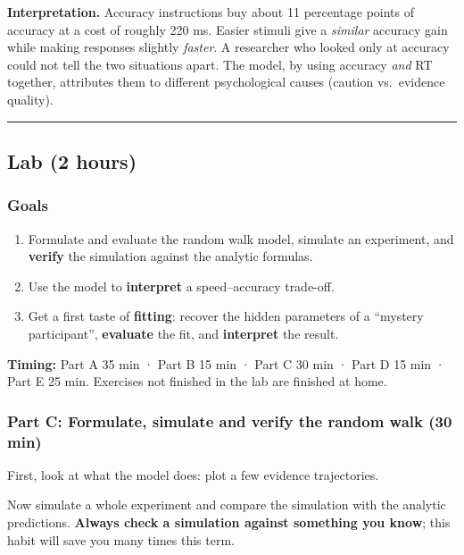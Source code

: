 \textbf{Interpretation.} Accuracy instructions buy about 11 percentage
points of accuracy at a cost of roughly 220 ms. Easier stimuli give a
\emph{similar} accuracy gain while making responses slightly
\emph{faster}. A researcher who looked only at accuracy could not tell
the two situations apart. The model, by using accuracy \emph{and} RT
together, attributes them to different psychological causes (caution
vs.~evidence quality).

\begin{center}\rule{0.5\linewidth}{0.5pt}\end{center}


\subsection{Lab (2 hours)}

\subsubsection{Goals}

\begin{enumerate}
\def\labelenumi{\arabic{enumi}.}
\tightlist
\item
  Formulate and evaluate the random walk model, simulate an experiment, and
  \textbf{verify} the simulation against the analytic formulas.
\item
  Use the model to \textbf{interpret} a speed--accuracy trade-off.
\item
  Get a first taste of \textbf{fitting}: recover the hidden parameters
  of a ``mystery participant'', \textbf{evaluate} the fit, and
  \textbf{interpret} the result.
\end{enumerate}

\textbf{Timing:} Part A 35 min · Part B 15 min · Part C 30 min · Part D
15 min · Part E 25 min. Exercises not finished in the lab are finished
at home.

\subsubsection{Part C: Formulate, simulate and verify the random walk
(30 min)}

First, look at what the model does: plot a few evidence trajectories.

Now simulate a whole experiment and compare the simulation with the
analytic predictions. \textbf{Always check a simulation against
something you know}; this habit will save you many times this term.

